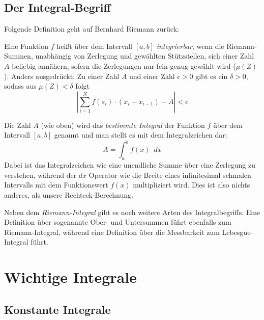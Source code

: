 \subsection{Der Integral-Begriff}

Folgende Definition geht auf Bernhard Riemann zurück:

\begin{definition}
Eine Funktion $f$ heißt über dem Intervall $[a,b]$ \emph{integrierbar}, wenn die Riemann-Summen, unabhängig von Zerlegung und gewählten Stützstellen, sich einer Zahl $A$ beliebig annähern, sofern die Zerlegungen nur fein genug gewählt wird ($\mu(Z)$). Anders ausgedrückt: Zu einer Zahl $A$ und einer Zahl $\epsilon >0$ gibt es ein $\delta >0$, sodass aus $\mu(Z)<\delta$ folgt
\begin{equation}
\left| \sum_{i=1}^{N} f(s_i)\cdot (x_{i}-x_{i-1}) -A \right| < \epsilon
\end{equation}
\end{definition}

\begin{definition}
Die Zahl $A$ (wie oben) wird das \emph{bestimmte Integral} der Funktion $f$ über dem Intervall $[a,b]$ genannt und man stellt es mit dem Integralzeichen dar:
\begin{equation}
A = \int_{a}^{b} f(x) \enspace dx
\end{equation}
Dabei ist das Integralzeichen wie eine unendliche Summe über eine Zerlegung zu verstehen, während der $dx$ Operator wie die Breite eines infinitesimal schmalen Intervalls mit dem Funktionswert $f(x)$ multipliziert wird. Dies ist also nichts anderes, als unsere Rechteck-Berechnung.
\end{definition}

Neben dem \emph{Riemann-Integral} gibt es noch weitere Arten des Integralbegriffs. Eine Definition über sogenannte Ober- und Untersummen führt ebenfalls zum Riemann-Integral, während eine Definition über die Messbarkeit zum Lebesgue-Integral führt.

\section{Wichtige Integrale}

\subsection{Konstante Integrale}

